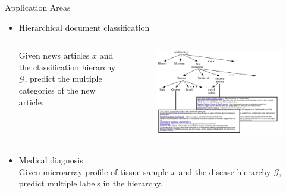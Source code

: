 \documentclass[first=dgreen,second=purple,logo=yellowexc]{aaltoslides}
\begin{document}
\begin{frame}[allowframebreaks]{Application Areas }
\begin{itemize}
    \item Hierarchical document classification \cite{veeramachaneni2005hierarchical,eps262947} 
    \begin{columns}
        \begin{column}{.5\linewidth}
            Given news articles $x$ and the classification hierarchy $\mathcal{G}$, predict the multiple categories of the new article. 
        \end{column}
        \begin{column}{.5\linewidth}
            \begin{figure}
                \includegraphics[scale=0.2]{./plots/document.jpg}
            \end{figure}
        \end{column}
    \end{columns}
    \framebreak
    \item Medical diagnosis \cite{Huang13042010}\\ 
        Given microarray profile of tissue sample $x$ and the disease hierarchy $\mathcal{G}$, predict multiple labels in the hierarchy.
        \begin{figure}

\end{figure}
\end{itemize}
\end{frame}
\end{document}
